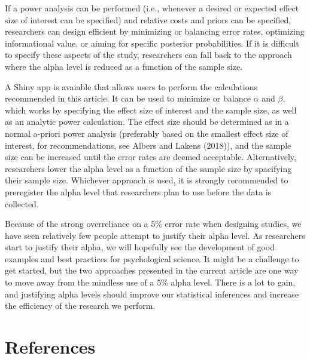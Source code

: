 \documentclass[
  english,
  ,jou,floatsintext]{apa6}
\begin{document}
If a power analysis can be performed (i.e., whenever a desired or expected effect size of interest can be specified) and relative costs and priors can be specified, researchers can design efficient by minimizing or balancing error rates, optimizing informational value, or aiming for specific posterior probabilities. If it is difficult to specify these aspects of the study, researchers can fall back to the approach where the alpha level is reduced as a function of the sample size.

A Shiny app is avaiable that allows users to perform the calculations recommended in this article. It can be used to minimize or balance \(\alpha\) and \(\beta\), which works by specifying the effect size of interest and the sample size, as well as an analytic power calculation. The effect size should be determined as in a normal a-priori power analysis (preferably based on the smallest effect size of interest, for recommendations, see Albers and Lakens (2018)), and the sample size can be increased until the error rates are deemed acceptable. Alternatively, researchers lower the alpha level as a function of the sample size by spacifying their sample size. Whichever approach is used, it is strongly recommended to preregister the alpha level that researchers plan to use before the data is collected.

Because of the strong overreliance on a 5\% error rate when designing studies, we have seen relatively few people attempt to justify their alpha level. As researchers start to justify their alpha, we will hopefully see the development of good examples and best practices for psychological science. It might be a challenge to get started, but the two approaches presented in the current article are one way to move away from the mindless use of a 5\% alpha level. There is a lot to gain, and justifying alpha levels should improve our statistical inferences and increase the efficiency of the research we perform.

\hypertarget{references}{%
\section{References}\label{references}}

\setlength{\parindent}{-0.5in}
\setlength{\leftskip}{0.5in}
\end{document}
